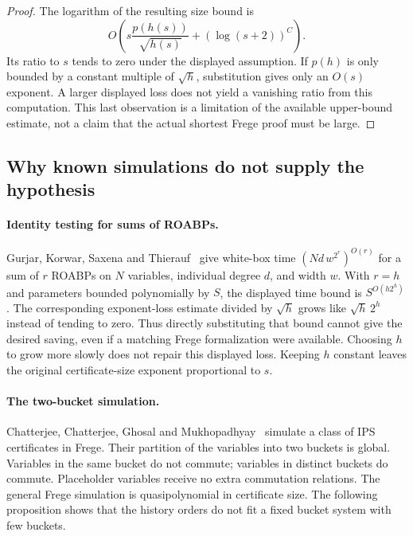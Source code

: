 \documentclass[11pt]{article}
\theoremstyle{definition}
\theoremstyle{remark}
\begin{document}
\begin{proof}
The logarithm of the resulting size bound is
\[
 O\!\left(s\frac{p(h(s))}{\sqrt{h(s)}}
                  +(\log(s+2))^C\right).
\]
Its ratio to $s$ tends to zero under the displayed assumption.
If $p(h)$ is only bounded by a constant multiple of $\sqrt h$,
substitution gives only an $O(s)$ exponent. A larger displayed loss
does not yield a vanishing ratio from this computation. This last
observation is a limitation of the available upper-bound estimate,
not a claim that the actual shortest Frege proof must be large.
\end{proof}

\subsection{Why known simulations do not supply the hypothesis}
\label{sec:frege-obstacles}

\paragraph{Identity testing for sums of ROABPs.}
Gurjar, Korwar, Saxena and Thierauf~\cite[Theorem~3.2 and the explicit
bound in the introduction]{GKST15} give white-box time
$(Nd\,w^{2^r})^{O(r)}$ for a sum of $r$ ROABPs on $N$ variables,
individual degree $d$, and width $w$.
With $r=h$ and parameters bounded polynomially by $S$, the displayed
time bound is $S^{O(h2^h)}$. The corresponding exponent-loss
estimate divided by $\sqrt h$ grows like $\sqrt h\,2^h$ instead of
tending to zero. Thus directly substituting that bound cannot
give the desired saving, even if a matching Frege formalization
were available. Choosing $h$ to grow more slowly does not repair
this displayed loss. Keeping $h$ constant leaves the original
certificate-size exponent proportional to $s$.

\paragraph{The two-bucket simulation.}
Chatterjee, Chatterjee, Ghosal and Mukhopadhyay~\cite[Definition~1.1
and Theorems~1.2 and~3.3]{CCGM26} simulate a class of IPS certificates
in Frege. Their partition of the variables into two buckets is global.
Variables in the same bucket do not commute; variables in distinct
buckets do commute. Placeholder variables receive no extra commutation
relations. The general Frege simulation is quasipolynomial in
certificate size. The following proposition shows that the history
orders do not fit a fixed bucket system with few buckets.
\end{document}
